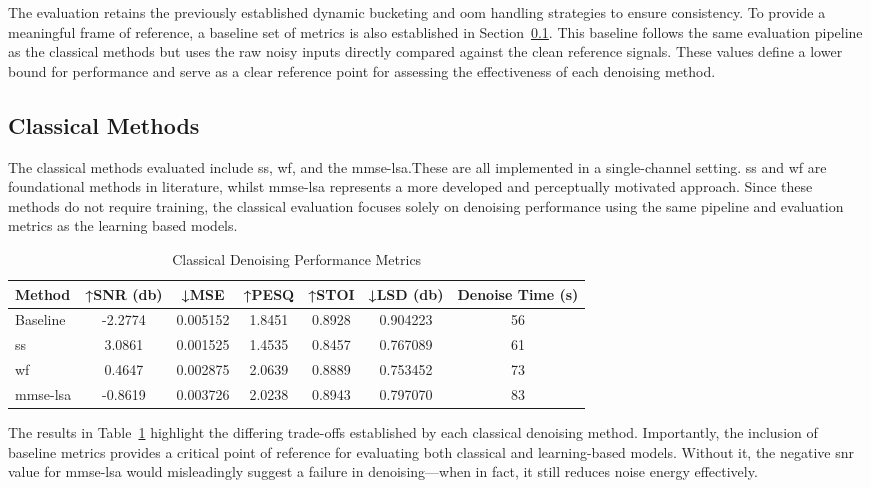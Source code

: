 The evaluation retains the previously established dynamic bucketing and \gls{oom} handling strategies to ensure consistency. To provide a meaningful frame of reference, a baseline set of metrics is also established in Section~\ref{sec:classical_methods}. This baseline follows the same evaluation pipeline as the classical methods but uses the raw noisy inputs directly compared against the clean reference signals. These values define a lower bound for performance and serve as a clear reference point for assessing the effectiveness of each denoising method.

\subsection{Classical Methods}
\label{sec:classical_methods}

The classical methods evaluated include \gls{ss}, \gls{wf}, and the \gls{mmse-lsa}.These are all implemented in a single-channel setting. \gls{ss} and \gls{wf} are foundational methods in literature, whilst \gls{mmse-lsa} represents a more developed and perceptually motivated approach. Since these methods do not require training, the classical evaluation focuses solely on denoising performance using the same pipeline and evaluation metrics as the learning based models.

\vspace{1em}
\begin{table}[H]
\centering
\caption{Classical Denoising Performance Metrics}
\label{tab:classical_metrics}
\begin{tabular}{|l|c|c|c|c|c|c|}
\hline
\textbf{Method} & \textbf{↑SNR (db)} & \textbf{↓MSE} & \textbf{↑PESQ} & \textbf{↑STOI} & \textbf{↓LSD (db)} & \textbf{Denoise Time (s)} \\
\hline
Baseline     & -2.2774 & 0.005152 & 1.8451 & 0.8928 & 0.904223 & 56 \\
\gls{ss}          & 3.0861 & 0.001525 & 1.4535 & 0.8457 & 0.767089 & 61 \\
\gls{wf}          & 0.4647 & 0.002875 & 2.0639 & 0.8889 & 0.753452 & 73 \\
\gls{mmse-lsa}    & -0.8619 & 0.003726 & 2.0238 & 0.8943 & 0.797070 & 83 \\
\hline
\end{tabular}
\end{table}

The results in Table~\ref{tab:classical_metrics} highlight the differing trade-offs established by each classical denoising method. Importantly, the inclusion of baseline metrics provides a critical point of reference for evaluating both classical and learning-based models. Without it, the negative \gls{snr} value for \gls{mmse-lsa} would misleadingly suggest a failure in denoising—when in fact, it still reduces noise energy effectively.

